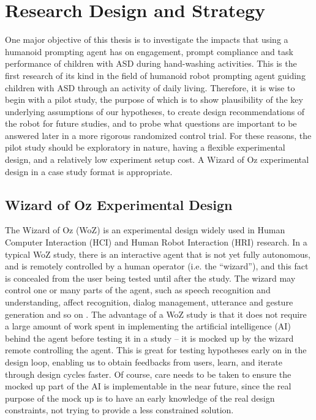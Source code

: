 \section{Research Design and Strategy}
One major objective of this thesis is to investigate the impacts that using a humanoid prompting agent has on engagement, prompt compliance and task performance of children with ASD during hand-washing activities.  This is the first research of its kind in the field of humanoid robot prompting agent guiding children with ASD through an activity of daily living.  Therefore, it is wise to begin with a pilot study, the purpose of which is to show plausibility of the key underlying assumptions of our hypotheses, to create design recommendations of the robot for future studies, and to probe what questions are important to be answered later in a more rigorous randomized control trial.  For these reasons, the pilot study should be exploratory in nature, having a flexible experimental design, and a relatively low experiment setup cost.  A Wizard of Oz experimental design in a case study format is appropriate.

\subsection{Wizard of Oz Experimental Design}
The Wizard of Oz (WoZ) is an experimental design widely used in Human Computer Interaction (HCI) and Human Robot Interaction (HRI) research.  In a typical WoZ study, there is an interactive agent that is not yet fully autonomous, and is remotely controlled by a human operator (i.e. the ``wizard''), and this fact is concealed from the user being tested until after the study.  The wizard may control one or many parts of the agent, such as speech recognition and understanding, affect recognition, dialog management, utterance and gesture generation and so on \cite{bhargava2013demonstration}.  The advantage of a WoZ study is that it does not require a large amount of work spent in implementing the artificial intelligence (AI) behind the agent before testing it in a study -- it is mocked up by the wizard remote controlling the agent.  This is great for testing hypotheses early on in the design loop, enabling us to obtain feedbacks from users, learn, and iterate through design cycles faster.  Of course, care needs to be taken to ensure the mocked up part of the AI is implementable in the near future, since the real purpose of the mock up is to have an early knowledge of the real design constraints, not trying to provide a less constrained solution.

